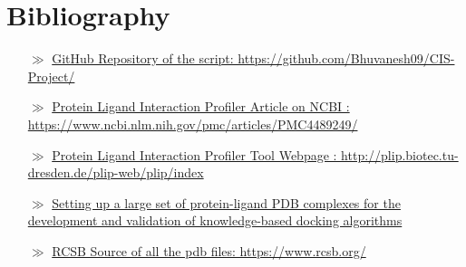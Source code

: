 \documentclass[12pt]{article}%
\begin{document}
\section*{Bibliography}
\vspace{10mm}
\begin{itemize}
\item[$\gg$]\href{https://github.com/Bhuvanesh09/CIS-Project/}{GitHub Repository of the script: https://github.com/Bhuvanesh09/CIS-Project/}

\item[$\gg$]\href{https://www.ncbi.nlm.nih.gov/pmc/articles/PMC4489249/}{Protein Ligand Interaction Profiler Article on NCBI : https://www.ncbi.nlm.nih.gov/pmc/articles/PMC4489249/}

\item[$\gg$]\href{http://plip.biotec.tu-dresden.de/plip-web/plip/index}{Protein Ligand Interaction Profiler Tool Webpage : http://plip.biotec.tu-dresden.de/plip-web/plip/index}

\item[$\gg$]\href{https://www.ncbi.nlm.nih.gov/pmc/articles/PMC2008766/}{Setting up a large set of protein-ligand PDB complexes for the development and validation of knowledge-based docking algorithms}

\item[$\gg$]\href{https://www.rcsb.org/}{RCSB Source of all the pdb files: https://www.rcsb.org/}
\end{itemize}
\end{document}
